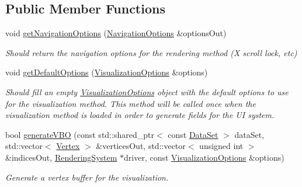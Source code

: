 \subsection*{Public Member Functions}
\begin{DoxyCompactItemize}
\item 
void \hyperlink{class_lots_of_lines_1_1_shifted_paired_coordinates_visualization_method_a5321d31a1b9d87b802080d263968bb30}{get\+Navigation\+Options} (\hyperlink{struct_lots_of_lines_1_1_navigation_options}{Navigation\+Options} \&options\+Out)\hypertarget{class_lots_of_lines_1_1_shifted_paired_coordinates_visualization_method_a5321d31a1b9d87b802080d263968bb30}{}\label{class_lots_of_lines_1_1_shifted_paired_coordinates_visualization_method_a5321d31a1b9d87b802080d263968bb30}

\begin{DoxyCompactList}\small\item\em Should return the navigation options for the rendering method (X scroll lock, etc) \end{DoxyCompactList}\item 
void \hyperlink{class_lots_of_lines_1_1_shifted_paired_coordinates_visualization_method_a8e77176927b8e3cd5e309636bb04f7a0}{get\+Default\+Options} (\hyperlink{class_lots_of_lines_1_1_visualization_options}{Visualization\+Options} \&options)\hypertarget{class_lots_of_lines_1_1_shifted_paired_coordinates_visualization_method_a8e77176927b8e3cd5e309636bb04f7a0}{}\label{class_lots_of_lines_1_1_shifted_paired_coordinates_visualization_method_a8e77176927b8e3cd5e309636bb04f7a0}

\begin{DoxyCompactList}\small\item\em Should fill an empty \hyperlink{class_lots_of_lines_1_1_visualization_options}{Visualization\+Options} object with the default options to use for the visualization method. This method will be called once when the visualization method is loaded in order to generate fields for the UI system. \end{DoxyCompactList}\item 
bool \hyperlink{class_lots_of_lines_1_1_shifted_paired_coordinates_visualization_method_a152e4c2e81fbb7dc6c3f41c24008faab}{generate\+V\+BO} (const std\+::shared\+\_\+ptr$<$ const \hyperlink{class_lots_of_lines_1_1_data_set}{Data\+Set} $>$ data\+Set, std\+::vector$<$ \hyperlink{struct_lots_of_lines_1_1_vertex}{Vertex} $>$ \&vertices\+Out, std\+::vector$<$ unsigned int $>$ \&indices\+Out, \hyperlink{class_lots_of_lines_1_1_rendering_system}{Rendering\+System} $\ast$driver, const \hyperlink{class_lots_of_lines_1_1_visualization_options}{Visualization\+Options} \&options)\hypertarget{class_lots_of_lines_1_1_shifted_paired_coordinates_visualization_method_a152e4c2e81fbb7dc6c3f41c24008faab}{}\label{class_lots_of_lines_1_1_shifted_paired_coordinates_visualization_method_a152e4c2e81fbb7dc6c3f41c24008faab}

\begin{DoxyCompactList}\small\item\em Generate a vertex buffer for the visualization. \end{DoxyCompactList}\end{DoxyCompactItemize}
